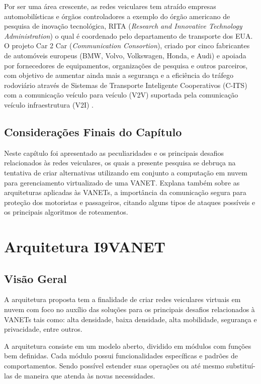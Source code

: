 \documentclass[
	12pt,				%
	oneside,			%
	a4paper,			%
	english,			%
	brazil				%
	]{abntex2ppgsi}
\begin{document}
Por ser uma área crescente, as redes veiculares tem atraído empresas automobilísticas e órgãos controladores  a exemplo do órgão americano de pesquisa de inovação tecnológica, RITA (\textit{Research and Innovative Technology Administration}) o qual é coordenado pelo departamento de transporte dos EUA. O projeto Car 2 Car (\textit{Communication Consortion}), criado por cinco fabricantes de automóveis europeus (BMW, Volvo, Volkswagen, Honda, e Audi) e apoiada por fornecedores de equipamentos, organizações de pesquisa e outros parceiros, com objetivo de aumentar ainda mais a segurança e a eficiência do tráfego rodoviário através de Sistemas de Transporte Inteligente Cooperativos (C-ITS) com a comunicação veículo para veículo (V2V) suportada pela comunicação veículo infraestrutura (V2I) . 

\section{Considerações Finais do Capítulo}
Neste capítulo foi apresentado as peculiaridades e os principais desafios relacionados às redes veiculares, os quais a presente pesquisa se debruça na tentativa de criar alternativas utilizando em conjunto a computação em nuvem para gerenciamento virtualizado de uma VANET. Explana também sobre as arquiteturas aplicadas às VANETs, a importância da comunicação segura para proteção dos motoristas e passageiros, citando alguns tipos de ataques possíveis e os principais algoritmos de roteamentos.

\chapter{Arquitetura I9VANET}\label{sec:i9vanet}

\section{Visão Geral}
A arquitetura proposta tem a finalidade de criar redes veiculares virtuais em nuvem com foco no auxílio das soluções para os principais desafios relacionados à VANETs tais como: alta densidade, baixa densidade, alta mobilidade, segurança e privacidade, entre outros. 

A arquitetura consiste em um modelo aberto, dividido em módulos com funções bem definidas. Cada módulo possui funcionalidades específicas e padrões de comportamentos. Sendo possível estender suas operações ou até mesmo substituí-las de maneira que atenda às novas necessidades.
\end{document}
